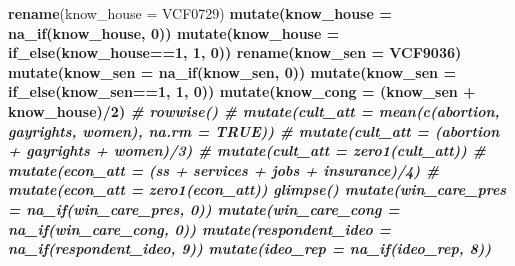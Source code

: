 \documentclass[
]{article}
\newenvironment{Shaded}{\begin{snugshade}}{\end{snugshade}}
\newcommand{\CommentTok}[1]{\textcolor[rgb]{0.56,0.35,0.01}{\textit{#1}}}
\newcommand{\DataTypeTok}[1]{\textcolor[rgb]{0.13,0.29,0.53}{#1}}
\newcommand{\DecValTok}[1]{\textcolor[rgb]{0.00,0.00,0.81}{#1}}
\newcommand{\KeywordTok}[1]{\textcolor[rgb]{0.13,0.29,0.53}{\textbf{#1}}}
\newcommand{\NormalTok}[1]{#1}
\newcommand{\OperatorTok}[1]{\textcolor[rgb]{0.81,0.36,0.00}{\textbf{#1}}}
\newcommand{\StringTok}[1]{\textcolor[rgb]{0.31,0.60,0.02}{#1}}
\begin{document}
\begin{Shaded}
\begin{Highlighting}[]
{{{{{{{{{{{{{{{{{{{{{{{{{{{{{{{{{{{{{{{{{{{{{{{{{{{{{{{{{{{{{{{{{{{{{{{{{{{{{\StringTok{    }\KeywordTok{rename}\NormalTok{(}\DataTypeTok{know_house =}\NormalTok{ VCF0729)}\OperatorTok{%>%}
\StringTok{    }\KeywordTok{mutate}\NormalTok{(}\DataTypeTok{know_house =} \KeywordTok{na_if}\NormalTok{(know_house, }\DecValTok{0}\NormalTok{))}\OperatorTok{%>%}
\StringTok{    }\KeywordTok{mutate}\NormalTok{(}\DataTypeTok{know_house =} \KeywordTok{if_else}\NormalTok{(know_house}\OperatorTok{==}\DecValTok{1}\NormalTok{, }\DecValTok{1}\NormalTok{, }\DecValTok{0}\NormalTok{))}\OperatorTok{%>%}
\StringTok{    }\KeywordTok{rename}\NormalTok{(}\DataTypeTok{know_sen =}\NormalTok{ VCF9036)}\OperatorTok{%>%}
\StringTok{    }\KeywordTok{mutate}\NormalTok{(}\DataTypeTok{know_sen =} \KeywordTok{na_if}\NormalTok{(know_sen, }\DecValTok{0}\NormalTok{))}\OperatorTok{%>%}
\StringTok{    }\KeywordTok{mutate}\NormalTok{(}\DataTypeTok{know_sen =} \KeywordTok{if_else}\NormalTok{(know_sen}\OperatorTok{==}\DecValTok{1}\NormalTok{, }\DecValTok{1}\NormalTok{, }\DecValTok{0}\NormalTok{))}\OperatorTok{%>%}
\StringTok{    }\KeywordTok{mutate}\NormalTok{(}\DataTypeTok{know_cong =}\NormalTok{ (know_sen }\OperatorTok{+}\StringTok{ }\NormalTok{know_house)}\OperatorTok{/}\DecValTok{2}\NormalTok{)}\OperatorTok{%>%}
\CommentTok{#   rowwise()%>%}
\CommentTok{#   mutate(cult_att = mean(c(abortion, gayrights, women), na.rm = TRUE))%>%}
\CommentTok{#   mutate(cult_att = (abortion + gayrights + women)/3)%>%}
\CommentTok{#   mutate(cult_att = zero1(cult_att))%>%}
\CommentTok{#   mutate(econ_att = (ss + services + jobs + insurance)/4)%>%}
\CommentTok{#   mutate(econ_att = zero1(econ_att))%>%}
\StringTok{    }\KeywordTok{glimpse}\NormalTok{()}\OperatorTok{%>%}\CommentTok{# adds only these variables to the df}
\StringTok{    }\KeywordTok{mutate}\NormalTok{(}\DataTypeTok{win_care_pres =} \KeywordTok{na_if}\NormalTok{(win_care_pres, }\DecValTok{0}\NormalTok{))}\OperatorTok{%>%}\StringTok{ }\CommentTok{#these functions set the specified value to NA, (per the ANES codebook)}
\StringTok{    }\KeywordTok{mutate}\NormalTok{(}\DataTypeTok{win_care_cong =} \KeywordTok{na_if}\NormalTok{(win_care_cong, }\DecValTok{0}\NormalTok{))}\OperatorTok{%>%}
\StringTok{    }\KeywordTok{mutate}\NormalTok{(}\DataTypeTok{respondent_ideo =} \KeywordTok{na_if}\NormalTok{(respondent_ideo, }\DecValTok{9}\NormalTok{))}\OperatorTok{%>%}\CommentTok{#the recode() function is used in the next 4 pipes to apply new values to observation in the columns. ANES uses numerical values to represent factors.}
\StringTok{    }\KeywordTok{mutate}\NormalTok{(}\DataTypeTok{ideo_rep =} \KeywordTok{na_if}\NormalTok{(ideo_rep, }\DecValTok{8}\NormalTok{))}\OperatorTok{%>%}
}}}}}}}}}}}}}}}}}}}}}}}}}}}}}}}}}}}}}}}}}}}}}}}}}}}}}}}}}}}}}}}}}}}}}}}}}}}}}}}}}}}}}}}}}}}}}}}
\end{Highlighting}
\end{Shaded}
\end{document}
